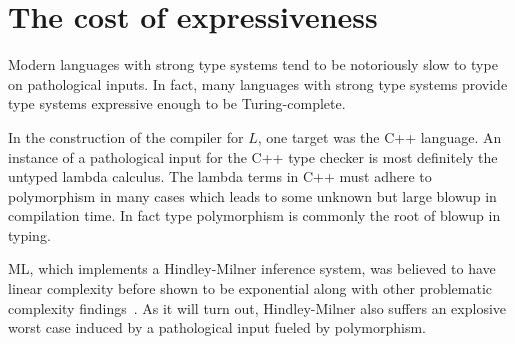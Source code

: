 \section{The cost of expressiveness}
Modern languages with strong type systems tend to be notoriously slow to type on pathological inputs.
In fact, many languages with strong type systems provide type systems expressive enough to be Turing-complete.

In the construction of the compiler for $L$, one target was the C++ language.
An instance of a pathological input for the C++ type checker is most definitely the untyped lambda calculus.
The lambda terms in C++ must adhere to polymorphism in many cases which leads to some unknown but large blowup in compilation time.
In fact type polymorphism is commonly the root of blowup in typing.

ML, which implements a Hindley-Milner inference system, was believed to have linear complexity before shown to be exponential along with other problematic complexity findings~\cite{mairson1989deciding}.
As it will turn out, Hindley-Milner also suffers an explosive worst case induced by a pathological input fueled by polymorphism.


